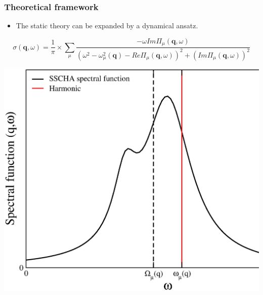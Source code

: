 \documentclass{beamer}
\begin{document}
\begin{frame}

 \frametitle{Theoretical framework}
 \begin{itemize}
 \item The static theory can be expanded by a dynamical ansatz.
 \end{itemize}
 \begin{equation}
 \sigma(\mathbf{q},\omega)=\frac{1}{\pi}\times\sum_{\mu}\frac{-\omega Im\Pi_{\mu}(\mathbf{q},\omega)}{(\omega^{2}-\omega_{\mu}^{2}
 (\mathbf{q})-Re\Pi_{\mu}(\mathbf{q},\omega))^{2}+(Im\Pi_{\mu}(\mathbf{q},\omega))^{2}}
 \nonumber
 \end{equation}
 \begin{center}
  \includegraphics[width=0.65\linewidth]{Pictures/THEORY/ins-toy1.eps}
 \end{center}

\end{frame}

\end{document}
